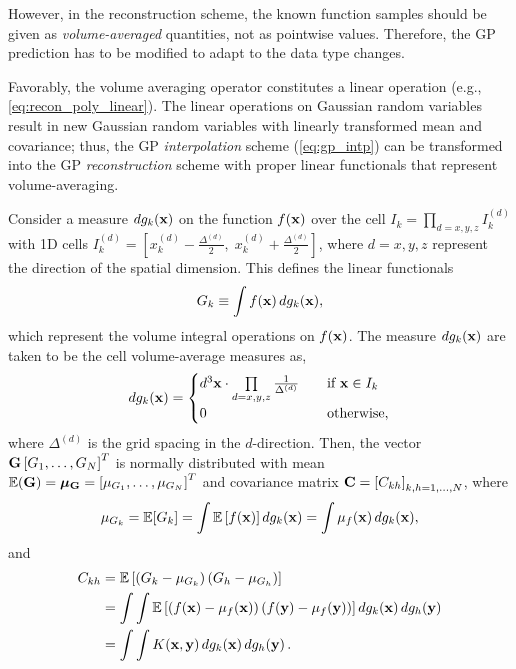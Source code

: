 However, in the reconstruction scheme, the known function samples should be given as \textit{volume-averaged} quantities,
not as pointwise values. Therefore, the GP prediction has to be modified to adapt to the data type changes.

Favorably, the volume averaging operator constitutes a linear operation (e.g., \cref{eq:recon_poly_linear}).
The linear operations on Gaussian random variables result in new Gaussian random variables with
linearly transformed mean and covariance; thus, the GP \textit{interpolation} scheme (\cref{eq:gp_intp})
can be transformed into the GP \textit{reconstruction} scheme
with proper linear functionals that represent volume-averaging.

Consider a measure \( dg_{k} (\mathbf{x}) \) on the function \( f(\mathbf{x}) \) over the cell
\( I_{k} = \prod_{d = x,y,z} I_{k}^{(d)} \) with 1D cells
\( I_{k}^{(d)} = \left[ x_{k}^{(d)} - \frac{\Delta^{(d)}}{2},\; x_{k}^{(d)} + \frac{\Delta^{(d)}}{2} \right] \),
where \( d = x,y,z \) represent the direction of the spatial dimension.
This defines the linear functionals
\begin{equation}\label{eq:gp_vol_intg}
    G_{k} \equiv \int f (\mathbf{x}) \mathop{d g_{k}(\mathbf{x})},
\end{equation}
which represent the volume integral operations on \( f(\mathbf{x}) \).
The measure \( dg_{k} (\mathbf{x}) \) are taken to be the cell volume-average measures as,
\begin{equation}\label{eq:gp_dgk}
    dg_{k} (\mathbf{x}) = \begin{cases}
        d^{3} \mathbf{x} \cdot \prod\limits_{d = x,y,z} \frac{1}{\Delta^{(d)}} \quad &\text{if } \mathbf{x} \in I_{k} \\
        0 &\text{otherwise},
    \end{cases}
\end{equation}
where \( \Delta^{(d)} \) is the grid spacing in the \( d \)-direction.
Then, the vector \( \mathbf{G} \left[ G_{1}, \dots, G_{N} \right]^{T} \)
is normally distributed with mean \( \mathbb{E}(\mathbf{G}) = \bm{\mu}_{\mathbf{G}} = \left[ \mu_{G_{1}}, \dots, \mu_{G_{N}} \right]^{T} \)
and covariance matrix \( \mathbf{C} = \left[ C_{kh} \right]_{k,h = 1, \dots, N} \), where
\begin{equation}\label{eq:gp_mu_G}
    \mu_{G_{k}} = \mathbb{E} [G_{k}] = \int \mathbb{E} \left[ f(\mathbf{x}) \right] \mathop{d g_{k} (\mathbf{x})} = \int \mu_{f} (\mathbf{x}) \mathop{d g_{k} (\mathbf{x})},
\end{equation}
and
\begin{equation}\label{eq:gp_Ckh}
    \begin{split}
        C_{kh} &= \mathbb{E} \left[ \left( G_{k} - \mu_{G_{k}} \right) \left( G_{h} - \mu_{G_{h}} \right) \right] \\
               &= \int \int \mathbb{E} \left[ \left( f(\mathbf{x}) - \mu_{f} (\mathbf{x}) \right) \left( f(\mathbf{y}) - \mu_{f} (\mathbf{y}) \right)\right] \mathop{d g_{k}(\mathbf{x})} \mathop{d g_{h} (\mathbf{y})} \\
               &= \int \int K (\mathbf{x}, \mathbf{y}) \mathop{d g_{k} (\mathbf{x})} \mathop{d g_{h} (\mathbf{y})}.
    \end{split}
\end{equation}
